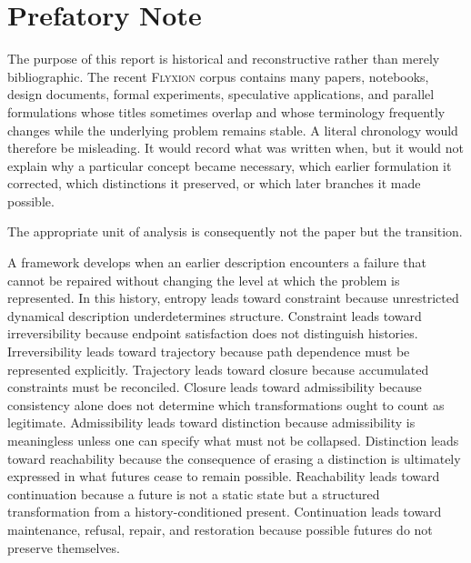 \documentclass[11pt]{article}
\theoremstyle{remark}
\newcommand{\Flyxion}{\textsc{Flyxion}}
\begin{document}
\begin{abstract}
The essay therefore presents the recent history of these frameworks as the gradual articulation of a single underlying problem: how irreversible systems preserve, destroy, reorganize, or regenerate the distinctions that determine their future possibilities. On this view, the deepest common object of the program is neither information, representation, nor state, but retained admissible possibility.

\end{abstract}

\section*{Prefatory Note}

The purpose of this report is historical and reconstructive rather than merely bibliographic. The recent \Flyxion{} corpus contains many papers, notebooks, design documents, formal experiments, speculative applications, and parallel formulations whose titles sometimes overlap and whose terminology frequently changes while the underlying problem remains stable. A literal chronology would therefore be misleading. It would record what was written when, but it would not explain why a particular concept became necessary, which earlier formulation it corrected, which distinctions it preserved, or which later branches it made possible.

The appropriate unit of analysis is consequently not the paper but the transition.

A framework develops when an earlier description encounters a failure that cannot be repaired without changing the level at which the problem is represented. In this history, entropy leads toward constraint because unrestricted dynamical description underdetermines structure. Constraint leads toward irreversibility because endpoint satisfaction does not distinguish histories. Irreversibility leads toward trajectory because path dependence must be represented explicitly. Trajectory leads toward closure because accumulated constraints must be reconciled. Closure leads toward admissibility because consistency alone does not determine which transformations ought to count as legitimate. Admissibility leads toward distinction because admissibility is meaningless unless one can specify what must not be collapsed. Distinction leads toward reachability because the consequence of erasing a distinction is ultimately expressed in what futures cease to remain possible. Reachability leads toward continuation because a future is not a static state but a structured transformation from a history-conditioned present. Continuation leads toward maintenance, refusal, repair, and restoration because possible futures do not preserve themselves.
\end{document}
